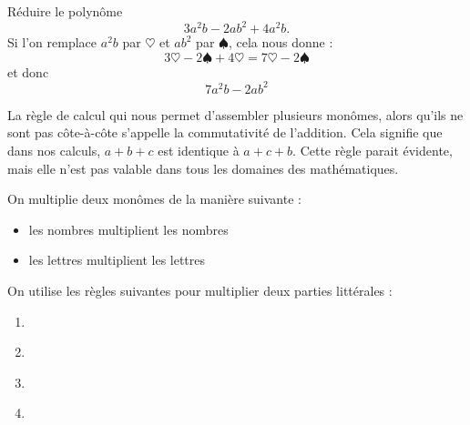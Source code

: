 \begin{exemple}
Réduire le polynôme
$$
3a^2 b - 2 a b^2 + 4 a^2 b.
$$
Si l'on remplace $a^2 b$ par $\heartsuit$ et $ab^2$ par $\spadesuit$, cela nous donne :
$$
3 \heartsuit -2 \spadesuit + 4 \heartsuit = 7\heartsuit -2\spadesuit
$$
et donc
$$
7a^2 b - 2 ab^2
$$
\end{exemple}

\begin{remarque}
La règle de calcul qui nous permet d'assembler plusieurs monômes, alors qu'ils ne sont pas côte-à-côte s'appelle la commutativité de l'addition. Cela signifie que dans nos calculs, 
$a+b+c$ est identique à $a + c + b$. Cette règle parait évidente, mais elle n'est pas valable dans tous les domaines des mathématiques.
\end{remarque}

\begin{definition}\label{distribuer}
On multiplie deux monômes de la manière suivante :
\begin{itemize}
\item les nombres multiplient les nombres
\item les lettres multiplient les lettres
\end{itemize}
\end{definition}

\begin{theoreme}
On utilise les règles suivantes pour multiplier deux parties littérales :
\begin{enumerate}
\item {}\label{frml1}
\item {}\label{frml2}
\item {}\label{frml3}
\item {}\label{frml4}
\end{enumerate}
\end{theoreme}

